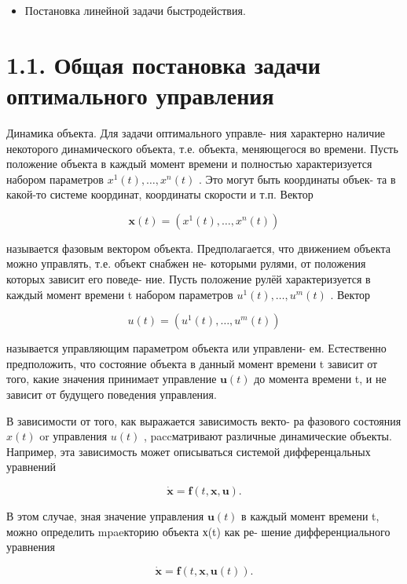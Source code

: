 \documentclass[8pt]{extarticle}
\begin{document}
\begin{itemize}\relax
\item\relax Постановка линейной задачи быстродействия.
\end{itemize}

\section*{1.1. Общая постановка задачи оптимального управления}

Динамика объекта. Для задачи оптимального управле- ния характерно наличие некоторого динамического объекта, т.е. объекта, меняющегося во времени. Пусть положение объекта в каждый момент времени и полностью характеризуется набором параметров \({x}^{1}\left( t\right) ,\ldots ,{x}^{n}\left( t\right)\) . Это могут быть координаты объек- та в какой-то системе координат, координаты скорости и т.п. Вектор

\[
\mathbf{x}\left( t\right)  = \left( {{x}^{1}\left( t\right) ,\ldots ,{x}^{n}\left( t\right) }\right)
\]

называется фазовым вектором объекта. Предполагается, что движением объекта можно управлять, т.е. объект снабжен не- которыми рулями, от положения которых зависит его поведе- ние. Пусть положение рулёй характеризуется в каждый момент времени t набором параметров \({u}^{1}\left( t\right) ,\ldots ,{u}^{m}\left( t\right)\) . Вектор

\[
u\left( t\right)  = \left( {{u}^{1}\left( t\right) ,\ldots ,{u}^{m}\left( t\right) }\right)
\]

называется управляющим параметром объекта или управлени- ем. Естественно предположить, что состояние объекта в данный момент времени t зависит от того, какие значения принимает управление \(\mathbf{u}\left( t\right)\) до момента времени t, и не зависит от будущего поведения управления.

В зависимости от того, как выражается зависимость векто- ра фазового состояния \(x\left( t\right)\) or управления \(u\left( t\right)\) , paccматривают различные динамические объекты. Например, эта зависимость может описываться системой дифференцальных уравнений

\[
\dot{\mathbf{x}} = \mathbf{f}\left( {t,\mathbf{x},\mathbf{u}}\right) . \tag{1.1}
\]

В этом случае, зная значение управления \(\mathbf{u}\left( t\right)\) в каждый момент времени t, можно определить mpaeкторию объекта х(t) как ре- шение дифференциального уравнения

\[
\dot{\mathbf{x}} = \mathbf{f}\left( {t,\mathbf{x},\mathbf{u}\left( t\right) }\right) .
\]
\end{document}
